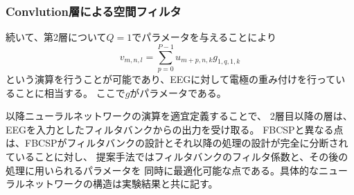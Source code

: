\subsubsection{\rm Convlution\mc 層による空間フィルタ}
続いて、第2層について\(Q=1\)でパラメータを与えることにより
\begin{equation}
    v_{m,n,l} = \sum_{p=0}^{P-1} u_{m+p,n,k} g_{1,q,1,k}
    \label{eq:pseudoFIR}
\end{equation} 
という演算を行うことが可能であり、EEGに対して電極の重み付けを行っていることに相当する。
ここで\(g\)がパラメータである。

以降ニューラルネットワークの演算を適宜定義することで、
2層目以降の層は、EEGを入力としたフィルタバンクからの出力を受け取る。
FBCSPと異なる点は、FBCSPがフィルタバンクの設計とそれ以降の処理の設計が完全に分断されていることに対し、
提案手法ではフィルタバンクのフィルタ係数と、その後の処理に用いられるパラメータを
同時に最適化可能な点である。具体的なニューラルネットワークの構造は実験結果と共に記す。





